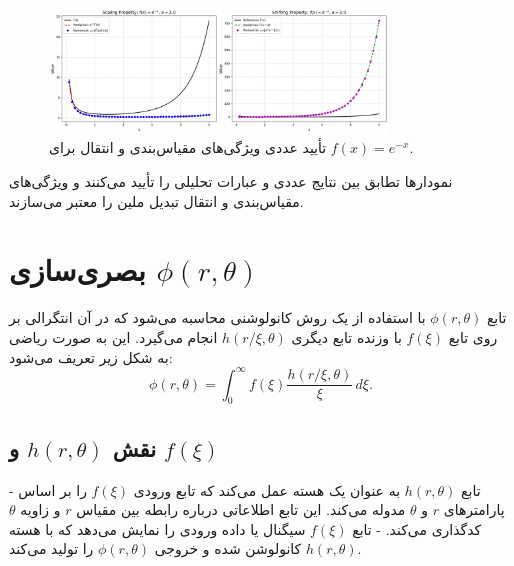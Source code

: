 \documentclass[12pt,a4paper]{article}
\begin{document}
\begin{figure}[H]
    \centering
    \includegraphics[width=0.8\textwidth]{Shifting and scaling.png}
    \caption{تأیید عددی ویژگی‌های مقیاس‌بندی و انتقال برای $f(x) = e^{-x}$.}
    \label{fig:scaling_shifting}
\end{figure}

نمودارها تطابق بین نتایج عددی و عبارات تحلیلی را تأیید می‌کنند و ویژگی‌های مقیاس‌بندی و انتقال تبدیل ملین را معتبر می‌سازند.
\section{بصری‌سازی $\phi(r, \theta)$}

تابع $\phi(r, \theta)$ با استفاده از یک روش کانولوشنی محاسبه می‌شود که در آن انتگرالی بر روی تابع $f(\xi)$ با وزنده تابع دیگری $h(r/\xi, \theta)$ انجام می‌گیرد. این به صورت ریاضی به شکل زیر تعریف می‌شود:
\begin{equation}
\phi(r, \theta) = \int_{0}^{\infty} f(\xi) \frac{h(r/\xi, \theta)}{\xi} \, d\xi.
\end{equation}

\subsection{نقش $h(r, \theta)$ و $f(\xi)$}
- تابع $h(r, \theta)$ به عنوان یک هسته عمل می‌کند که تابع ورودی $f(\xi)$ را بر اساس پارامترهای $r$ و $\theta$ مدوله می‌کند. این تابع اطلاعاتی درباره رابطه بین مقیاس $r$ و زاویه $\theta$ کدگذاری می‌کند.
- تابع $f(\xi)$ سیگنال یا داده ورودی را نمایش می‌دهد که با هسته $h(r, \theta)$ کانولوشن شده و خروجی $\phi(r, \theta)$ را تولید می‌کند.
\end{document}
